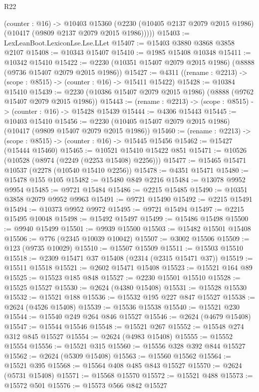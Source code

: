 \begin{lexlean}{R22}
\begin{coremodule}
      (counter : @16) ->
      @10403
        @15360
        (@2230 (@10405 @2137 @2079 @2015 @1986) (@10417 (@9809 @2137 @2079 @2015 @1986)))))
@15403 := LexLeanBoot.LexiconLse.Lse.LLet
@15407 := @15403 @3880 @3868 @3858 @2107
@15408 := @10343 @15407
@15410 := @1985 @15408 @10348
@15411 := @10342 @15410
@15422 := @2230 (@10351 @15407 @2079 @2015 @1986) (@8888 (@9736 @15407 @2079 @2015 @1986))
@15427 := @4311 ((rename : @2213) -> (scope : @8515) -> (counter : @16) -> @15411 @15422)
@15428 := @10384 @15410
@15439 := @2230 (@10386 @15407 @2079 @2015 @1986) (@8888 (@9762 @15407 @2079 @2015 @1986))
@15443 := (rename : @2213) -> (scope : @8515) -> (counter : @16) -> @15428 @15439
@15444 := @4306 @15443
@15445 := @10403 @15410
@15456 := @2230 (@10405 @15407 @2079 @2015 @1986) (@10417 (@9809 @15407 @2079 @2015 @1986))
@15460 := (rename : @2213) -> (scope : @8515) -> (counter : @16) -> @15445 @15456
@15462 := @15427 (@15444 @15460)
@15465 := @10521 @15410 @15422 @851
@15471 := @10526 (@10528 (@8974 (@2249 (@2253 @15408) @2256)))
@15477 := @15465 @15471 @10537 (@2278 (@10540 @15410 @2256))
@15478 := @4351 @15471
@15480 := @15478 @155 @105
@15482 := @15480 @849 @2216
@15484 := @13078 @9952 @9954
@15485 := @9721 @15484
@15486 := @2215 @15485
@15490 := @10351 @3858 @2079 @9952 @9963
@15491 := @9721 @15490
@15492 := @2215 @15491
@15494 := @10373 @9952 @9972
@15495 := @9721 @15494
@15497 := @2215 @15495 @10048
@15498 := @15492 @15497
@15499 := @15486 @15498
@15500 := @9940 @15499
@15501 := @9939 @15500
@15503 := @15482 @15501 @15408
@15506 := @776 (@2345 @10039 @10042)
@15507 := @3002 @15506
@15509 := @123 (@9735 @10029)
@15510 := @15507 @15509
@15511 := @15503 @15510
@15518 := @2309 @15471 @37 @15408 (@2314 (@2315 @15471 @37))
@15519 := @15511 @15518
@15521 := @2602 @15471 @15408
@15523 := @15521 @164 @89
@15525 := @15523 @185 @848
@15527 := @2230 @15501 @15510
@15528 := @15525 @15527
@15530 := @2624 (@4380 @15408)
@15531 := @15528 @15530
@15532 := @15521 @188
@15536 := @15532 @195 @227 @847 @15527
@15538 := @2624 (@4526 @15408)
@15539 := @15536 @15538
@15540 := @15521 @230
@15544 := @15540 @249 @264 @846 @15527
@15546 := @2624 (@4679 @15408)
@15547 := @15544 @15546
@15548 := @15521 @267
@15552 := @15548 @274 @312 @845 @15527
@15554 := @2624 (@4983 @15408)
@15555 := @15552 @15554
@15556 := @15521 @315
@15560 := @15556 @328 @392 @844 @15527
@15562 := @2624 (@5309 @15408)
@15563 := @15560 @15562
@15564 := @15521 @395
@15568 := @15564 @408 @485 @843 @15527
@15570 := @2624 (@5731 @15408)
@15571 := @15568 @15570
@15572 := @15521 @488
@15573 := @15572 @501
@15576 := @15573 @566 @842 @15527

\end{coremodule}
\end{lexlean}
